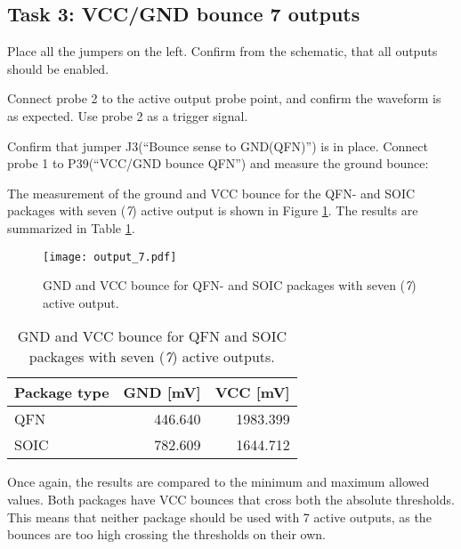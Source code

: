 \documentclass[../main.tex]{subfiles}
\begin{document}
\subsection{Task 3: VCC/GND bounce 7 outputs}

Place all the jumpers on the left. Confirm from the schematic, that all outputs should be enabled.

\vspace{10pt}

Connect probe 2 to the active output probe point, and confirm the waveform is as expected. Use probe 2 as a trigger signal.

\vspace{10pt}

Confirm that jumper J3(“Bounce sense to GND(QFN)”) is in place. Connect probe 1 to P39(“VCC/GND bounce QFN”) and measure the ground bounce:

\solution

The measurement of the ground and VCC bounce for the QFN- and SOIC packages with seven (\textit{7}) active output is shown in Figure \ref{fig:gnd_vcc_output_7}. The results are summarized in Table \ref{tab:output_7}.

\begin{figure}[H]
    \centering
    \texttt{[image: output\_7.pdf]}
    \caption{GND and VCC bounce for QFN- and SOIC packages with seven (\textit{7}) active output.}
    \label{fig:gnd_vcc_output_7}
\end{figure}
\begin{table}[H]
    \centering
    \begin{tabular}{l | r r}
        \toprule[1pt]
        Package type    & GND [mV]  & VCC [mV]\\
        \midrule
        QFN             & 446.640   & 1983.399  \\
        SOIC            & 782.609   & 1644.712  \\
        \bottomrule[1pt]
    \end{tabular}
    \caption{GND and VCC bounce for QFN and SOIC packages with seven (\textit{7}) active outputs.}
    \label{tab:output_7}
\end{table}

Once again, the results are compared to the minimum and maximum allowed values. Both packages have VCC bounces that cross both the absolute thresholds. This means that neither package should be used with 7 active outputs, as the bounces are too high crossing the thresholds on their own.
\end{document}

